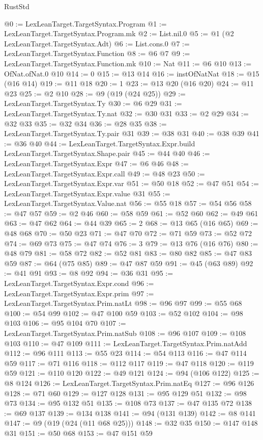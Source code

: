 \begin{lexlean}{RustStd}
\begin{coremodule}
@0 := LexLeanTarget.TargetSyntax.Program
@1 := LexLeanTarget.TargetSyntax.Program.mk
@2 := List.nil.{0}
@5 := @1 (@2 LexLeanTarget.TargetSyntax.Adt)
@6 := List.cons.{0}
@7 := LexLeanTarget.TargetSyntax.Function
@8 := @6 @7
@9 := LexLeanTarget.TargetSyntax.Function.mk
@10 := Nat
@11 := @6 @10
@13 := OfNat.ofNat.{0} @10
@14 := 0
@15 := @13 @14
@16 := instOfNatNat
@18 := @15 (@16 @14)
@19 := @11 @18
@20 := 1
@23 := @13 @20 (@16 @20)
@24 := @11 @23
@25 := @2 @10
@28 := @9 (@19 (@24 @25))
@29 := LexLeanTarget.TargetSyntax.Ty
@30 := @6 @29
@31 := LexLeanTarget.TargetSyntax.Ty.nat
@32 := @30 @31
@33 := @2 @29
@34 := @32 @33
@35 := @32 @34
@36 := @28 @35
@38 := LexLeanTarget.TargetSyntax.Ty.pair @31
@39 := @38 @31
@40 := @38 @39
@41 := @36 @40
@44 := LexLeanTarget.TargetSyntax.Expr.build LexLeanTarget.TargetSyntax.Shape.pair
@45 := @44 @40
@46 := LexLeanTarget.TargetSyntax.Expr
@47 := @6 @46
@48 := LexLeanTarget.TargetSyntax.Expr.call
@49 := @48 @23
@50 := LexLeanTarget.TargetSyntax.Expr.var
@51 := @50 @18
@52 := @47 @51
@54 := LexLeanTarget.TargetSyntax.Expr.value @31
@55 := LexLeanTarget.TargetSyntax.Value.nat
@56 := @55 @18
@57 := @54 @56
@58 := @47 @57
@59 := @2 @46
@60 := @58 @59
@61 := @52 @60
@62 := @49 @61
@63 := @47 @62
@64 := @44 @39
@65 := 2
@68 := @13 @65 (@16 @65)
@69 := @48 @68
@70 := @50 @23
@71 := @47 @70
@72 := @71 @59
@73 := @52 @72
@74 := @69 @73
@75 := @47 @74
@76 := 3
@79 := @13 @76 (@16 @76)
@80 := @48 @79
@81 := @58 @72
@82 := @52 @81
@83 := @80 @82
@85 := @47 @83 @59
@87 := @64 (@75 @85)
@89 := @47 @87 @59
@91 := @45 (@63 @89)
@92 := @41 @91
@93 := @8 @92
@94 := @36 @31
@95 := LexLeanTarget.TargetSyntax.Expr.cond
@96 := LexLeanTarget.TargetSyntax.Expr.prim
@97 := LexLeanTarget.TargetSyntax.Prim.natLt
@98 := @96 @97
@99 := @55 @68
@100 := @54 @99
@102 := @47 @100 @59
@103 := @52 @102
@104 := @98 @103
@106 := @95 @104 @70
@107 := LexLeanTarget.TargetSyntax.Prim.natSub
@108 := @96 @107
@109 := @108 @103
@110 := @47 @109
@111 := LexLeanTarget.TargetSyntax.Prim.natAdd
@112 := @96 @111
@113 := @55 @23
@114 := @54 @113
@116 := @47 @114 @59
@117 := @71 @116
@118 := @112 @117
@119 := @47 @118
@120 := @119 @59
@121 := @110 @120
@122 := @49 @121
@124 := @94 (@106 @122)
@125 := @8 @124
@126 := LexLeanTarget.TargetSyntax.Prim.natEq
@127 := @96 @126
@128 := @71 @60
@129 := @127 @128
@131 := @95 @129 @51
@132 := @98 @73
@134 := @95 @132 @51
@135 := @108 @73
@137 := @47 @135 @72
@138 := @69 @137
@139 := @134 @138
@141 := @94 (@131 @139)
@142 := @8 @141
@147 := @9 (@19 (@24 (@11 @68 @25)))
@148 := @32 @35
@150 := @147 @148 @31
@151 := @50 @68
@153 := @47 @151 @59

\end{coremodule}
\end{lexlean}
